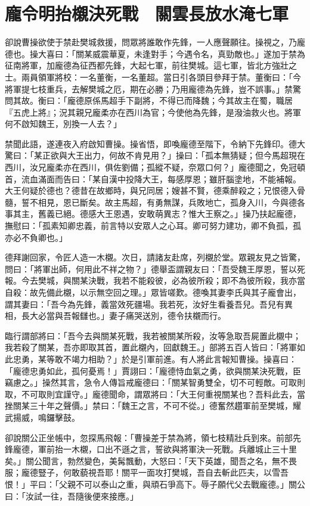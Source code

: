 
\chapter{龐令明抬櫬決死戰　關雲長放水淹七軍}

卻說曹操欲使于禁赴樊城救援，問眾將誰敢作先鋒，一人應聲願往。操視之，乃龐德也。操大喜曰：「關某威震華夏，未逢對手；今遇令名，真勁敵也。」遂加于禁為征南將軍，加龐德為征西都先鋒，大起七軍，前往樊城。這七軍，皆北方強壯之士。兩員領軍將校：一名董衡，一名董超。當日引各頭目參拜于禁。董衡曰：「今將軍提七枝重兵，去解樊城之厄，期在必勝；乃用龐德為先鋒，豈不誤事。」禁驚問其故。衡曰：「龐德原係馬超手下副將，不得已而降魏；今其故主在蜀，職居『五虎上將』；況其親兄龐柔亦在西川為官；今使他為先鋒，是潑油救火也。將軍何不啟知魏王，別換一人去？」

禁聞此語，遂連夜入府啟知曹操。操省悟，即喚龐德至階下，令納下先鋒印。德大驚曰：「某正欲與大王出力，何故不肯見用？」操曰：「孤本無猜疑；但今馬超現在西川，汝兄龐柔亦在西川，俱佐劉備；孤縱不疑，奈眾口何？」龐德聞之，免冠頓首，流血滿面而告曰：「某自漢中投降大王，每感厚恩；雖肝腦塗地，不能補報。大王何疑於德也？德昔在故鄉時，與兄同居；嫂甚不賢，德乘醉殺之；兄恨德入骨髓，誓不相見，恩已斷矣。故主馬超，有勇無謀，兵敗地亡，孤身入川，今與德各事其主，舊義已絕。德感大王恩遇，安敢萌異志？惟大王察之。」操乃扶起龐德，撫慰曰：「孤素知卿忠義，前言特以安眾人之心耳。卿可努力建功，卿不負孤，孤亦必不負卿也。」

德拜謝回家，令匠人造一木櫬。次日，請諸友赴席，列櫬於堂。眾親友見之皆驚，問曰：「將軍出師，何用此不祥之物？」德舉盃謂親友曰：「吾受魏王厚恩，誓以死報。今去樊城，與關某決戰，我若不能殺彼，必為彼所殺；即不為彼所殺，我亦當自殺：故先備此櫬，以示無空回之理。」眾皆嗟歎。德喚其妻李氏與其子龐會出，謂其妻曰：「吾今為先鋒，義當效死疆場。我若死，汝好生看養吾兒。吾兒有異相，長大必當與吾報讎也。」妻子痛哭送別，德令扶櫬而行。

臨行謂部將曰：「吾今去與關某死戰，我若被關某所殺，汝等急取吾屍置此櫬中；我若殺了關某，吾亦即取其首，置此櫬內，回獻魏王。」部將五百人皆曰：「將軍如此忠勇，某等敢不竭力相助？」於是引軍前進。有人將此言報知曹操。操喜曰：「龐德忠勇如此，孤何憂焉！」賈詡曰：「龐德恃血氣之勇，欲與關某決死戰，臣竊慮之。」操然其言，急令人傳旨戒龐德曰：「關某智勇雙全，切不可輕敵。可取則取，不可取則宜謹守。」龐德聞命，謂眾將曰：「大王何重視關某也？吾料此去，當挫關某三十年之聲價。」禁曰：「魏王之言，不可不從。」德奮然趲軍前至樊城，耀武揚威，鳴鑼擊鼓。

卻說關公正坐帳中，忽探馬飛報：「曹操差于禁為將，領七枝精壯兵到來。前部先鋒龐德，軍前抬一木櫬，口出不遜之言，誓欲與將軍決一死戰。兵離城止三十里矣。」關公聞言，勃然變色，美髯飄動，大怒曰：「天下英雄，聞吾之名，無不畏服；龐德豎子，何敢藐視吾耶！關平一面攻打樊城，吾自去斬此匹夫，以雪吾恨！」平曰：「父親不可以泰山之重，與頑石爭高下。辱子願代父去戰龐德。」關公曰：「汝試一往，吾隨後便來接應。」

